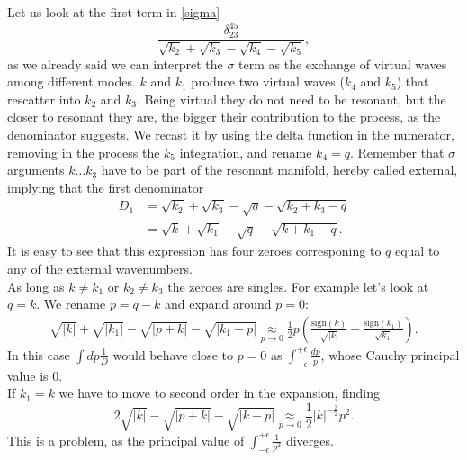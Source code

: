     Let us look at the first term in \eqref{sigma}
    \begin{equation}
        \frac{\delta_{23}^{45}}{\sqrt{k_2}+\sqrt{k_3}-\sqrt{k_4}-\sqrt{k_5}},
    \end{equation} 
    as we already said we can interpret the $\sigma$ term as the exchange of virtual waves among different modes.
    $k$ and $k_1$ produce two virtual waves ($k_4$ and $k_5$) that rescatter into $k_2$ and $k_3$.
    Being virtual they do not need to be resonant, but the closer to resonant they are, the bigger their contribution to the process, as the denominator suggests.   
    We recast it by using the delta function in the numerator, removing in the process the $k_5$ integration, and rename $k_4=q$. Remember that $\sigma$ arguments $k\dots k_3$ have to be part of the resonant manifold, hereby called external, implying  that the first denominator
    \begin{equation}
        \begin{aligned}
      D_1 &= \sqrt{k_2} + \sqrt{k_3} -\sqrt{q} - \sqrt{k_2 + k_3 - q}\\
       &= \sqrt{k} + \sqrt{k_1} -\sqrt{q} - \sqrt{k + k_1 - q}.
        \end{aligned}
    \end{equation}
    It is easy to see that this expression has four zeroes corresponing to $q$ equal to any of the external wavenumbers. \\
    As long as $k \neq k_1$ or $k_2 \neq k_3$ the zeroes are singles. For example let's look at $q = k$. We rename $p = q-k$ and expand around $p=0$:
    \begin{align*}
      \sqrt{|k|} + \sqrt{|k_1|} -\sqrt{|p+k|} - \sqrt{|k_1 - p|} \underset{p \rightarrow 0}{\approx} \frac{1}{2} p \left(\frac{\text{sign}(k)}{\sqrt{|k|}} - \frac{\text{sign}(k_1)}{\sqrt{k_1}}\right).
    \end{align*}
    In this case $\int dp\frac{1}{D}$ would behave close to $p=0$ as $\int_{-\epsilon}^{+\epsilon}\frac{dp}{p}$, whose Cauchy principal value is 0. \\
    If $k_1 = k$ we have to move to second order in the expansion, finding 
    \begin{equation}
      2\sqrt{|k|} -\sqrt{|p+k|} - \sqrt{|k - p|} \underset{p \rightarrow 0}{\approx} \frac{1}{2}|k|^{-\frac{3}{2}} p^2.
    \end{equation}
    This is a problem, as the principal value of $\int_{-\epsilon}^{+\epsilon}\frac{1}{p^2}$ diverges.\\
